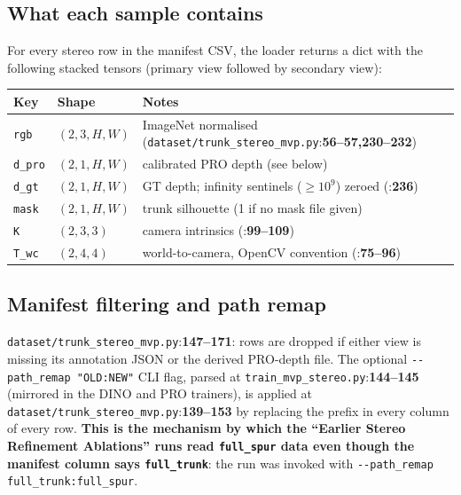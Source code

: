 \documentclass[11pt]{article}
\newcommand{\fref}[2]{\texttt{\textcolor{filegray}{#1}}:\textbf{#2}}
\begin{document}
\subsection{What each sample contains}

For every stereo row in the manifest CSV, the loader returns a dict with
the following stacked tensors (primary view followed by secondary view):

\begin{center}\small
\begin{tabular}{lll}
\toprule
\textbf{Key} & \textbf{Shape} & \textbf{Notes} \\
\midrule
\texttt{rgb}   & $(2,3,H,W)$ & ImageNet normalised
                              (\fref{dataset/trunk\_stereo\_mvp.py}{56--57,230--232}) \\
\texttt{d\_pro} & $(2,1,H,W)$ & calibrated PRO depth (see below) \\
\texttt{d\_gt}  & $(2,1,H,W)$ & GT depth; infinity sentinels
                                ($\geq 10^9$) zeroed
                                (\fref{}{236}) \\
\texttt{mask}   & $(2,1,H,W)$ & trunk silhouette (1 if no mask file given) \\
\texttt{K}      & $(2,3,3)$    & camera intrinsics
                                  (\fref{}{99--109}) \\
\texttt{T\_wc}  & $(2,4,4)$    & world-to-camera, OpenCV convention
                                  (\fref{}{75--96}) \\
\bottomrule
\end{tabular}
\end{center}

\subsection{Manifest filtering and path remap}
\fref{dataset/trunk\_stereo\_mvp.py}{147--171}: rows are dropped if either
view is missing its annotation JSON or the derived PRO-depth file. The
optional \texttt{-{}-path\_remap "OLD:NEW"} CLI flag, parsed at
\fref{train\_mvp\_stereo.py}{144--145} (mirrored in the DINO and PRO
trainers), is applied at
\fref{dataset/trunk\_stereo\_mvp.py}{139--153} by replacing the prefix in
every column of every row. \textbf{This is the mechanism by which the
``Earlier Stereo Refinement Ablations'' runs read
\texttt{full\_spur} data even though the manifest column says
\texttt{full\_trunk}}: the run was invoked with
\texttt{-{}-path\_remap full\_trunk:full\_spur}.
\end{document}
